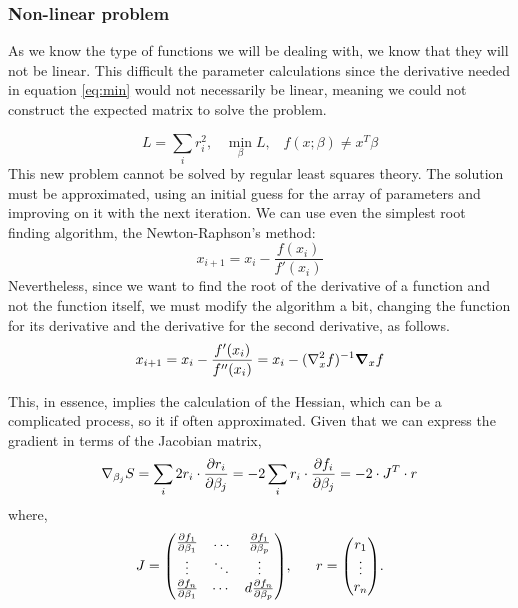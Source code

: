 \documentclass[12pt,twoside]{extarticle}
\begin{document}
\subsubsection{Non-linear problem}
As we know the type of functions we will be dealing with, we know that they will not be linear. This difficult the parameter calculations since the derivative needed in equation \ref{eq:min} would not necessarily be linear, meaning we could not construct the expected matrix to solve the problem.

\begin{equation}
    L= \sum_i r^2_i,  \,\,\,\,\, \min_\beta L, \,\,\,\,\, f(x;\beta) \neq x^T \beta
\end{equation}
This new problem cannot be solved by regular least squares theory. The solution must be approximated, using an initial guess for the array of parameters and improving on it with the next iteration.
We can use even the simplest root finding algorithm, the Newton-Raphson's method:
\begin{equation}
    x_{i+1}= x_i - \frac{f(x_i)}{f'(x_i)}
\end{equation}
Nevertheless, since we want to find the root of the derivative of a function and not the function itself, we must modify the algorithm a bit, changing the function for its derivative and the derivative for the second derivative, as follows.
\begin{equation}
    x_{i+1}= x_i - \frac{f'(x_i)}{f''(x_i)}
    = x_i -(\laplacian_x f)^{-1} \grad_x f
\end{equation}

This, in essence, implies the calculation of the Hessian, which can be a complicated process, so it if often approximated. Given that we can express the gradient in terms of the Jacobian matrix,
\begin{equation}
    \nabla_{\beta_j} S = \sum_i 2r_i \cdot \pdv{r_i}{\beta_j}
    =-2\sum_i r_i \cdot \pdv{f_i}{\beta_j} = -2\cdot J^T \cdot r
\end{equation}
where,
\begin{equation}
    J=
    \mqty(\pdv{f_1}{\beta_1} & \hdots &\pdv{f_1}{\beta_p}\\
    \vdots & \ddots & \vdots \\
    \pdv{f_n}{\beta_1} & \cdots & d\pdv{f_n}{\beta_p}), 
\,\,\,\,\,  
\,\,\,\,\,  
    r = \mqty( r_1\\ \vdots \\ r_n).
\end{equation}
\end{document}
